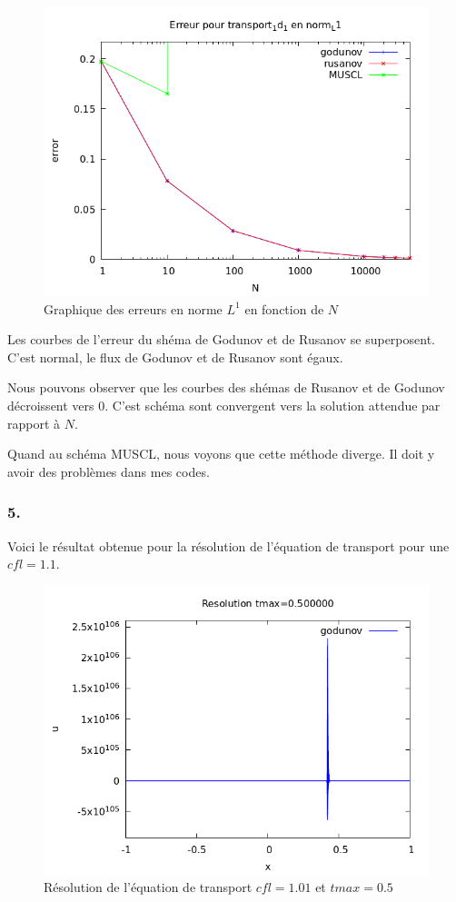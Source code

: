 \documentclass{article}
\begin{document}
\begin{figure}[H]
	\centering
	\includegraphics[scale=0.5]{figure/error_transport.png}
	\caption{Graphique des erreurs en norme $L^1$ en fonction de $N$}
\end{figure}

Les courbes de l'erreur du shéma de Godunov et de Rusanov se superposent. C'est normal, le flux de Godunov 
et de Rusanov sont égaux.

Nous pouvons observer que les courbes des shémas de Rusanov et de Godunov décroissent vers 0. C'est schéma 
sont convergent vers la solution attendue par rapport à $N$.

Quand au schéma MUSCL, nous voyons que cette méthode diverge. Il doit y avoir des problèmes dans mes codes.

\subsubsection*{5.}

Voici le résultat obtenue pour la résolution de l'équation de transport pour une $cfl=1.1$.

\begin{figure}[H]
	\centering
	\includegraphics[scale=0.5]{figure/transport_unstable.png}
	\caption{Résolution de l'équation de transport $cfl=1.01$ et $tmax=0.5$}
\end{figure}
\end{document}
